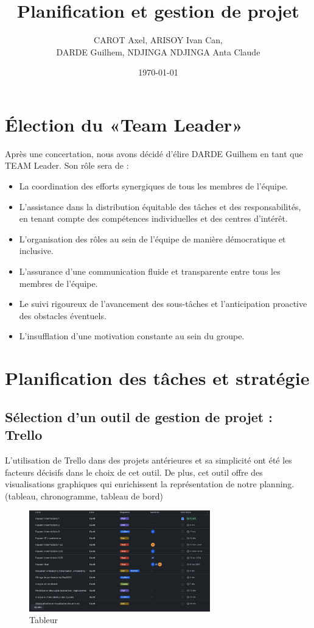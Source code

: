 \documentclass{article}
\title{Planification et gestion de projet}
\author{CAROT Axel, ARISOY Ivan Can, \\ DARDE Guilhem, NDJINGA NDJINGA Anta Claude}
\date{\today}
\begin{document}
\maketitle

\section{Élection du «Team Leader»}
Après une concertation, nous avons décidé d'élire DARDE Guilhem en tant que TEAM Leader. Son rôle sera de :
\begin{itemize}
    \item La coordination des efforts synergiques de tous les membres de l’équipe.
    \item L'assistance dans la distribution équitable des tâches et des responsabilités, en tenant compte des compétences individuelles et des centres d'intérêt.
    \item L'organisation des rôles au sein de l'équipe de manière démocratique et inclusive.
    \item L'assurance d'une communication fluide et transparente entre tous les membres de l'équipe.
    \item Le suivi rigoureux de l'avancement des sous-tâches et l'anticipation proactive des obstacles éventuels.
    \item L'insufflation d'une motivation constante au sein du groupe.
\end{itemize}

\section{Planification des tâches et stratégie}

\subsection{Sélection d'un outil de gestion de projet : Trello}
L'utilisation de Trello dans des projets antérieures et sa simplicité ont été les facteurs décisifs dans le choix de cet outil. De plus, cet outil offre  des visualisations graphiques qui enrichissent la représentation de notre planning. (tableau, chronogramme, tableau de bord)

\begin{figure}[h]
    \centering
    \includegraphics[width=0.7\textwidth]{tableur.png}
    \caption{Tableur}
    \label{fig:mon_image}
\end{figure}
\vspace{5cm}
\end{document}
